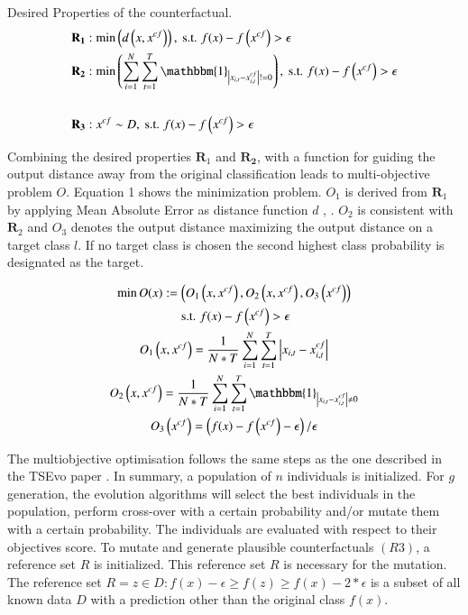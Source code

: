 \begin{definition}
Desired Properties of the counterfactual.
$$
\begin{aligned}
& \mathbf{R}_{\mathbf{1}}: \min \left(d\left(x, x^{c f}\right)\right), \text { s.t. } f(x) - f\left(x^{c f}\right) > \epsilon\\
& \mathbf{R}_{\mathbf{2}}: \min \left(\sum_{i=1}^{N} \sum_{t=1}^{T} \mathbbm{1}_{\left|x_{i, t}-x_{i, t}^{c f}\right| !=0}\right), \text { s.t. } f(x) - f\left(x^{c f}\right) > \epsilon\\
& \\
& \mathbf{R}_{\mathbf{3}}: x^{c f} \sim D, \text { s.t. } f(x) - f\left(x^{c f}\right) > \epsilon
\end{aligned}
$$ 
\end{definition}

Combining the desired properties $\mathbf{R}_{1}$ and $\mathbf{R}_{\mathbf{2}}$, with a function for guiding the output distance away from the original classification leads to multi-objective problem $O$. Equation 1 shows the minimization problem. $O_{1}$ is derived from $\mathbf{R}_{1}$ by applying Mean Absolute Error as distance function $d$ \cite{mothilal_explaining_2020}, \cite{wachter_counterfactual_2018}. $O_{2}$ is consistent with $\mathbf{R}_{2}$ and $O_{3}$ denotes the output distance maximizing the output distance on a target class $l$. If no target class is chosen the second highest class probability is designated as the target.

\begin{multline}
\min O(x):=\left(O_{1}\left(x, x^{c f}\right), O_{2}\left(x, x^{c f}\right), O_{3}\left(x^{c f}\right)\right) \\
\text { s.t. } f(x) - f\left(x^{c f}\right) > \epsilon \\
O_{1}\left(x, x^{c f}\right)=\frac{1}{N * T} \sum_{i=1}^{N} \sum_{t=1}^{T}\left|x_{i, t}-x_{i, t}^{c f}\right| \\
O_{2}\left(x, x^{c f}\right)=\frac{1}{N * T} \sum_{i=1}^{N} \sum_{t=1}^{T} \mathbbm{1}_{\left|x_{i, t}-x_{i, t}^{c f}\right| \neq 0} \\
O_{3}\left(x^{c f}\right)=\left(f(x) - f\left(x^{c f}\right)-\epsilon\right) / \epsilon    \\
\end{multline}

The multiobjective optimisation follows the same steps as the one described in the TSEvo paper \cite{hollig_tsevo_2022}.
In summary, a population of $n$ individuals is initialized. For $g$ generation, the evolution algorithms will select the best individuals in the population, perform cross-over with a certain probability and/or mutate them with a certain probability. The individuals are evaluated with respect to their objectives score. 
To mutate and generate plausible counterfactuals $(R3)$, a reference set $R$ is initialized. This reference set $R$ is necessary for the mutation. The reference set $R = {z \in D : f(x)-\epsilon \geq f(z) \geq f(x)-2*\epsilon}$ is a subset of all known data $D$ with a prediction other than the original class $f(x)$.